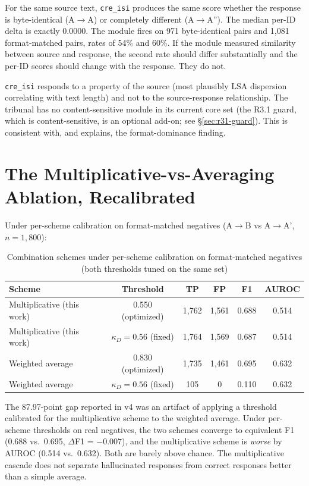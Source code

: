 \documentclass[11pt,a4paper]{article}
\begin{document}
For the same source text, \texttt{cre\_isi} produces the same score whether the response is byte-identical (A$\rightarrow$A) or completely different (A$\rightarrow$A''). The median per-ID delta is exactly 0.0000. The module fires on 971 byte-identical pairs and 1{,}081 format-matched pairs, rates of 54\% and 60\%. If the module measured similarity between source and response, the second rate should differ substantially and the per-ID scores should change with the response. They do not.

\texttt{cre\_isi} responds to a property of the source (most plausibly LSA dispersion correlating with text length) and not to the source-response relationship. The tribunal has no content-sensitive module in its current core set (the R3.1 guard, which is content-sensitive, is an optional add-on; see \S\ref{sec:r31-guard}). This is consistent with, and explains, the format-dominance finding.

\section{The Multiplicative-vs-Averaging Ablation, Recalibrated}
\label{sec:avg-recalibrated}

Under per-scheme calibration on format-matched negatives (A$\rightarrow$B vs A$\rightarrow$A', $n=1{,}800$):

\begin{table}[H]
\centering
\caption{Combination schemes under per-scheme calibration on format-matched negatives (both thresholds tuned on the same set)}
\label{tab:avg-ablation}
\begin{tabular}{@{}lccccc@{}}
\toprule
Scheme & Threshold & TP & FP & F1 & AUROC \\
\midrule
Multiplicative (this work) & 0.550 (optimized) & 1{,}762 & 1{,}561 & 0.688 & 0.514 \\
Multiplicative (this work) & $\kappa_D = 0.56$ (fixed) & 1{,}764 & 1{,}569 & 0.687 & 0.514 \\
Weighted average           & 0.830 (optimized)          & 1{,}735 & 1{,}461 & 0.695 & 0.632 \\
Weighted average           & $\kappa_D = 0.56$ (fixed)          & 105 & 0          & 0.110 & 0.632 \\
\bottomrule
\end{tabular}
\end{table}

The 87.97-point gap reported in v4 was an artifact of applying a threshold calibrated for the multiplicative scheme to the weighted average. Under per-scheme thresholds on real negatives, the two schemes converge to equivalent F1 (0.688 vs.\ 0.695, $\Delta$F1 = $-0.007$), and the multiplicative scheme is \emph{worse} by AUROC (0.514 vs.\ 0.632). Both are barely above chance. The multiplicative cascade does not separate hallucinated responses from correct responses better than a simple average.
\end{document}
